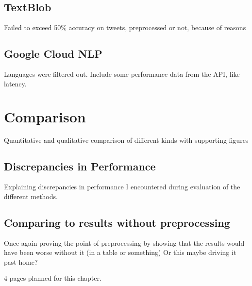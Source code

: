 \subsection{TextBlob}
\label{subsec:textblob}

Failed to exceed 50\% accuracy on tweets, preprocessed or not, because of reasons

\subsection{Google Cloud NLP}
\label{subsec:googleCloudNlp} %

Languages were filtered out.
Include some performance data from the API, like latency.

\section{Comparison}
\label{sec:comparison}

Quantitative and qualitative comparison of different kinds with supporting figures

\subsection{Discrepancies in Performance}
\label{subsec:discrepanciesinperformance}

Explaining discrepancies in performance I encountered during evaluation of the different methods.

\subsection{Comparing to results without preprocessing}
\label{subsec:comparingToResultsWithoutPreprocessing}

Once again proving the point of preprocessing by showing that the results would have been worse without it (in a table or something)
Or this maybe driving it past home?

4 pages planned for this chapter.
\pagebreak[4]
